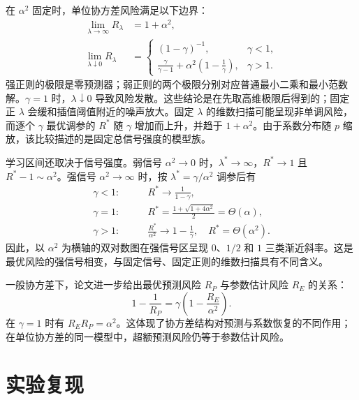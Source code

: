 \documentclass[UTF8,fontset=fandol,a4paper,zihao=-4]{ctexart}
\begin{document}
在 $\alpha^2$ 固定时，单位协方差风险满足以下边界：
\begin{align}
 \lim_{\lambda\to\infty}R_\lambda&=1+\alpha^2,\label{eq:large}\\
 \lim_{\lambda\downarrow0}R_\lambda&=
 \begin{cases}
 (1-\gamma)^{-1},&\gamma<1,\\
 \displaystyle\frac{\gamma}{\gamma-1}+\alpha^2\left(1-\frac{1}{\gamma}\right),&\gamma>1.
 \end{cases}\label{eq:small}
\end{align}
强正则的极限是零预测器；弱正则的两个极限分别对应普通最小二乘和最小范数解。$\gamma=1$ 时，$\lambda\downarrow0$ 导致风险发散。这些结论是在先取高维极限后得到的；固定正 $\lambda$ 会缓和插值阈值附近的噪声放大。固定 $\lambda$ 的维数扫描可能呈现非单调风险，而逐个 $\gamma$ 最优调参的 $R^*$ 随 $\gamma$ 增加而上升，并趋于 $1+\alpha^2$。由于系数分布随 $p$ 缩放，该比较描述的是固定总信号强度的模型族。

学习区间还取决于信号强度。弱信号 $\alpha^2\to0$ 时，$\lambda^*\to\infty$，$R^*\to1$ 且 $R^*-1\sim\alpha^2$。强信号 $\alpha^2\to\infty$ 时，按 $\lambda^*=\gamma/\alpha^2$ 调参后有
\begin{align}
 \gamma<1:&\qquad R^*\longrightarrow\frac{1}{1-\gamma},\label{eq:strongunder}\\
 \gamma=1:&\qquad R^*=\frac{1+\sqrt{1+4\alpha^2}}{2}=\Theta(\alpha),
 \label{eq:strongequal}\\
 \gamma>1:&\qquad\frac{R^*}{\alpha^2}\longrightarrow1-\frac{1}{\gamma},
 \quad R^*=\Theta(\alpha^2).\label{eq:strongover}
\end{align}
因此，以 $\alpha^2$ 为横轴的双对数图在强信号区呈现 $0$、$1/2$ 和 $1$ 三类渐近斜率。这是最优风险的强信号相变，与固定信号、固定正则的维数扫描具有不同含义。

一般协方差下，论文进一步给出最优预测风险 $R_P$ 与参数估计风险 $R_E$ 的关系\cite[推论 2.4]{dw}：
\begin{equation}\label{eq:inaccuracy}
 1-\frac{1}{R_P}=\gamma\left(1-\frac{R_E}{\alpha^2}\right).
\end{equation}
在 $\gamma=1$ 时有 $R_ER_P=\alpha^2$。这体现了协方差结构对预测与系数恢复的不同作用；在单位协方差的同一模型中，超额预测风险仍等于参数估计风险。

\section{实验复现}\label{sec:results}
\end{document}
